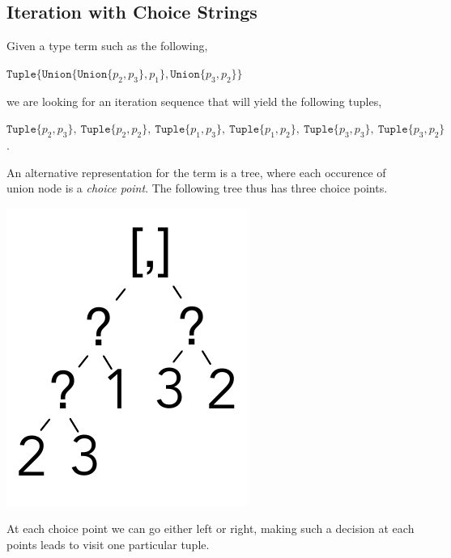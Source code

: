 \documentclass[a4paper,english]{lipics-v2019}
\newcommand{\xt}[1]{\texttt{#1}}
\newcommand{\union}[2]{\xt{Union\{}#1,#2\xt{\}}}
\newcommand{\tuple}[1]{\xt{Tuple\{}#1\xt{\}}}
\begin{document}
\subsection{Iteration with Choice Strings}\label{cs}

Given a type term such as the following,

\medskip
$\tuple{ \union{ \union{p_2}{p_3} }{p_1}, \union{p_3}{p_2}}$
\medskip

\noindent
we are looking for an iteration sequence that will yield the following tuples,

\medskip
\noindent $\tuple{p_2,p_3}, ~ \tuple{p_2,p_2}, ~ \tuple{p_1,p_3}, ~ \tuple{p_1,p_2}, ~
  \tuple{p_3,p_3}, ~ \tuple{p_3,p_2}$.
\medskip\vspace{-3mm}

\noindent
An alternative representation for the term is a tree, where each occurence
of union node is a \emph{choice point}. The following tree thus has three
choice points.
\medskip

\includegraphics[scale=.25]{figures/tree1.pdf}
\smallskip

\noindent
At each choice point we can go either left or right, making such a decision
at each points leads to visit one particular tuple.
\end{document}
